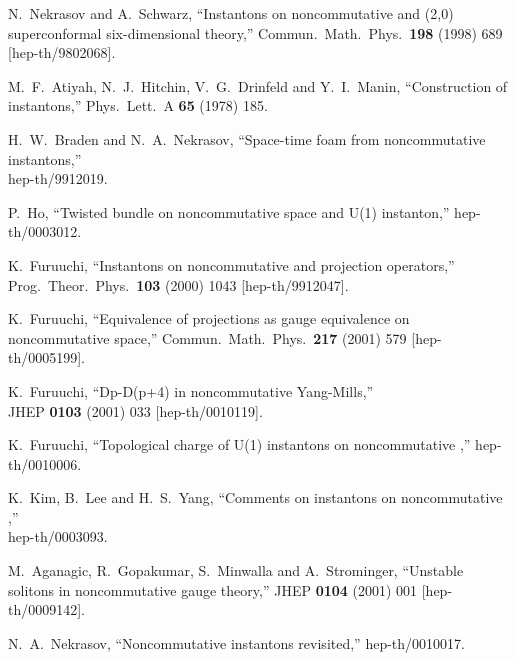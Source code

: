 \documentclass[a4paper,11pt]{article}
\numberwithin{equation}{section}
\providecommand{\R}{\mathbb R}
\begin{document}
{\begin{thebibliography}{99}
N.~Nekrasov and A.~Schwarz,
``Instantons on noncommutative \myHighlight{$\R^4$}\coordHE{} and (2,0) superconformal 
  six-dimensional theory,''
Commun.\ Math.\ Phys.\  {\bf 198} (1998) 689
[hep-th/9802068].

M.~F.~Atiyah, N.~J.~Hitchin, V.~G.~Drinfeld and Y.~I.~Manin,
``Construction of instantons,''
Phys.\ Lett.\ A {\bf 65} (1978) 185.

H.~W.~Braden and N.~A.~Nekrasov,
``Space-time foam from noncommutative instantons,''\\
hep-th/9912019.

P.~Ho,
``Twisted bundle on noncommutative space and U(1) instanton,''
hep-th/0003012.

K.~Furuuchi,
``Instantons on noncommutative \myHighlight{$\R^4$}\coordHE{} and projection operators,''\\
Prog.\ Theor.\ Phys.\  {\bf 103} (2000) 1043
[hep-th/9912047].

K.~Furuuchi,
``Equivalence of projections as gauge equivalence on noncommutative space,''
Commun.\ Math.\ Phys.\  {\bf 217} (2001) 579
[hep-th/0005199].

K.~Furuuchi,
``Dp-D(p+4) in noncommutative Yang-Mills,''\\
JHEP {\bf 0103} (2001) 033
[hep-th/0010119].

K.~Furuuchi,
``Topological charge of U(1) instantons on noncommutative \myHighlight{$\R^4$}\coordHE{},''
hep-th/0010006.

K.~Kim, B.~Lee and H.~S.~Yang,
``Comments on instantons on noncommutative \myHighlight{$\R^4$}\coordHE{},''\\
hep-th/0003093.

M.~Aganagic, R.~Gopakumar, S.~Minwalla and A.~Strominger,
``Unstable solitons in noncommutative gauge theory,''
JHEP {\bf 0104} (2001) 001
[hep-th/0009142].

N.~A.~Nekrasov,
``Noncommutative instantons revisited,''
hep-th/0010017.


\end{thebibliography}}
\end{document}

